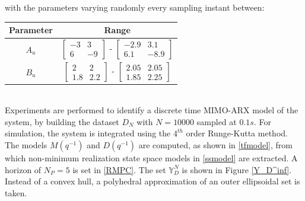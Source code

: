\documentclass[letterpaper, 10 pt, conference]{ieeeconf}  %
\begin{document}
with the parameters varying randomly every sampling instant between:
\begin{table}[h!]
	\hspace{50pt}
	\begin{tabular}{||c|c||} 
		\hline
		Parameter & Range \vspace{1pt}\\ [0.5ex] 
		\hline
		$A_u$ & $\begin{bmatrix} -3 & 3 \\ 6 & -9 \end{bmatrix}$ - 
		$\begin{bmatrix} -2.9 & 3.1 \\ 6.1 & -8.9 \end{bmatrix}$  \vspace{1pt}\\
		$B_u$ & $\begin{bmatrix} 2 & 2 \\ 1.8 & 2.2 \end{bmatrix}$ - 
		$\begin{bmatrix} 2.05 & 2.05 \\ 1.85 & 2.25 \end{bmatrix}$  \\
		\hline
	\end{tabular}
	\label{Simparam}
	\vspace{-10pt}  
\end{table}
\\
Experiments are performed to identify a discrete time MIMO-ARX model of the system, by building the dataset $D_N$ with $N=10000$ sampled at $0.1s$. For simulation, the system is integrated using the $4^{th}$ order Runge-Kutta method.
The models $M(q^{-1})$ and $D(q^{-1})$ are computed, as shown in \eqref{tfmodel}, from which non-minimum realization state space models in \eqref{ssmodel} are extracted. A horizon of $N_P=5$ is set in \eqref{RMPC}. The set $\mathbb{Y}_D^{N}$ is shown in Figure \ref{Y_D^inf}. Instead of a convex hull, a polyhedral approximation of an outer ellipsoidal set is taken. 
\end{document}
